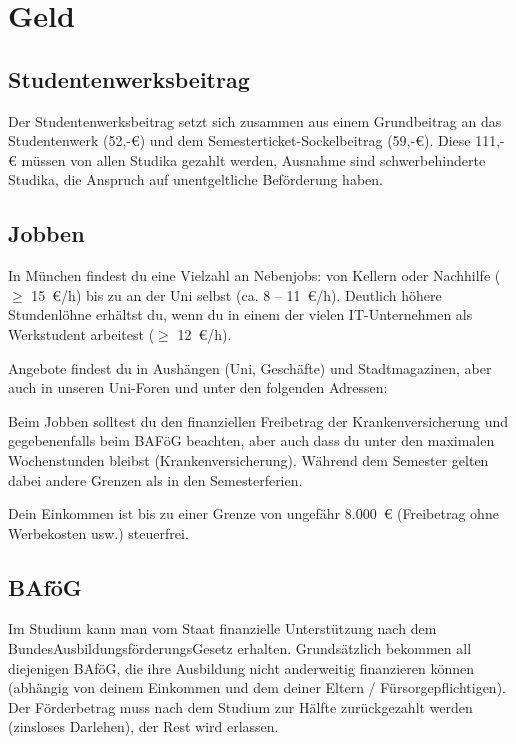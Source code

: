 ﻿
\chapter{Geld}

\section{Studentenwerksbeitrag}
Der Studentenwerksbeitrag setzt sich zusammen aus einem Grundbeitrag an das Studentenwerk (52,-€) und dem
Semesterticket-Sockelbeitrag (59,-€).
Diese 111,-€ müssen von allen Studika gezahlt werden, Ausnahme sind schwerbehinderte Studika, die Anspruch
auf unentgeltliche Beförderung haben.

\section{Jobben}
In München findest du eine Vielzahl an Nebenjobs: von Kellern oder Nachhilfe ($\geq$ 15~€/h) bis zu an der Uni selbst (ca. 8 -- 11~€/h). Deutlich höhere Stundenlöhne erhältst du, wenn du in einem der vielen IT-Unternehmen als Werkstudent arbeitest ($\geq$ 12~€/h).

Angebote findest du in Aushängen (Uni, Geschäfte) und Stadtmagazinen, aber auch in unseren Uni-Foren und unter den folgenden Adressen:
\begin{urlList}
\end{urlList}

Beim Jobben solltest du den finanziellen Freibetrag der Krankenversicherung und gegebenenfalls beim BAFöG beachten, aber auch dass du unter den maximalen Wochenstunden bleibst (Krankenversicherung). Während dem Semester gelten dabei andere Grenzen als in den Semesterferien.

Dein Einkommen ist bis zu einer Grenze von ungefähr 8.000~€ (Freibetrag ohne Werbekosten usw.) steuerfrei.


\section{BAföG}
Im Studium kann man vom Staat finanzielle Unterstützung nach dem BundesAusbildungsförderungsGesetz erhalten. Grundsätzlich bekommen all diejenigen BAföG, die ihre Ausbildung nicht anderweitig finanzieren können (abhängig von deinem Einkommen und dem deiner Eltern / Fürsorgepflichtigen). Der Förderbetrag muss nach dem Studium zur Hälfte zurückgezahlt werden (zinsloses Darlehen), der Rest wird erlassen.

